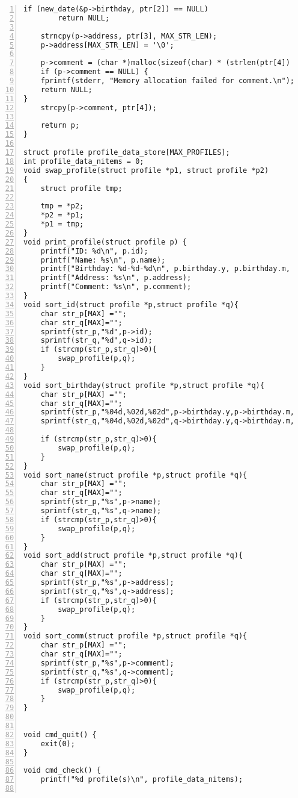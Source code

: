 \begin{Verbatim}[numbers=left, xleftmargin=10mm, numbersep=6pt,
                    fontsize=\small, baselinestretch=0.8]
    if (new_date(&p->birthday, ptr[2]) == NULL)
        return NULL;

    strncpy(p->address, ptr[3], MAX_STR_LEN);
    p->address[MAX_STR_LEN] = '\0';

    p->comment = (char *)malloc(sizeof(char) * (strlen(ptr[4]) + 1));
    if (p->comment == NULL) {
    fprintf(stderr, "Memory allocation failed for comment.\n");
    return NULL;
}
    strcpy(p->comment, ptr[4]);

    return p;
}

struct profile profile_data_store[MAX_PROFILES];
int profile_data_nitems = 0;
void swap_profile(struct profile *p1, struct profile *p2)
{
    struct profile tmp;

    tmp = *p2;
    *p2 = *p1;
    *p1 = tmp;
}
void print_profile(struct profile p) {
    printf("ID: %d\n", p.id);
    printf("Name: %s\n", p.name);
    printf("Birthday: %d-%d-%d\n", p.birthday.y, p.birthday.m, p.birthday.d);
    printf("Address: %s\n", p.address);
    printf("Comment: %s\n", p.comment);
}
void sort_id(struct profile *p,struct profile *q){
    char str_p[MAX] ="";
    char str_q[MAX]="";
    sprintf(str_p,"%d",p->id);
    sprintf(str_q,"%d",q->id);
    if (strcmp(str_p,str_q)>0){
        swap_profile(p,q);
    }
}
void sort_birthday(struct profile *p,struct profile *q){
    char str_p[MAX] ="";
    char str_q[MAX]="";
    sprintf(str_p,"%04d,%02d,%02d",p->birthday.y,p->birthday.m,p->birthday.d);
    sprintf(str_q,"%04d,%02d,%02d",q->birthday.y,q->birthday.m,q->birthday.d);
    
    if (strcmp(str_p,str_q)>0){
        swap_profile(p,q);
    }
}
void sort_name(struct profile *p,struct profile *q){
    char str_p[MAX] ="";
    char str_q[MAX]="";
    sprintf(str_p,"%s",p->name);
    sprintf(str_q,"%s",q->name);
    if (strcmp(str_p,str_q)>0){
        swap_profile(p,q);
    }
}
void sort_add(struct profile *p,struct profile *q){
    char str_p[MAX] ="";
    char str_q[MAX]="";
    sprintf(str_p,"%s",p->address);
    sprintf(str_q,"%s",q->address);
    if (strcmp(str_p,str_q)>0){
        swap_profile(p,q);
    }
}
void sort_comm(struct profile *p,struct profile *q){
    char str_p[MAX] ="";
    char str_q[MAX]="";
    sprintf(str_p,"%s",p->comment);
    sprintf(str_q,"%s",q->comment);
    if (strcmp(str_p,str_q)>0){
        swap_profile(p,q);
    }
}


void cmd_quit() {
    exit(0);
}

void cmd_check() {
    printf("%d profile(s)\n", profile_data_nitems);
    

\end{Verbatim}

